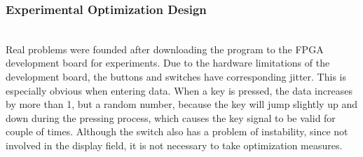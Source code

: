 \documentclass[conference,compsoc]{IEEEtran}
\begin{document}
\subsubsection{Experimental Optimization Design}
\hfill\\

Real problems were founded after downloading the program to the FPGA development board for experiments. Due to the hardware limitations of the development board, the buttons and switches have corresponding jitter. This is especially obvious when entering data. When a key is pressed, the data increases by more than 1, but a random number, because the key will jump slightly up and down during the pressing process, which causes the key signal to be valid for couple of times. Although the switch also has a problem of instability, since not involved in the display field, it is not necessary to take optimization measures.
\end{document}
